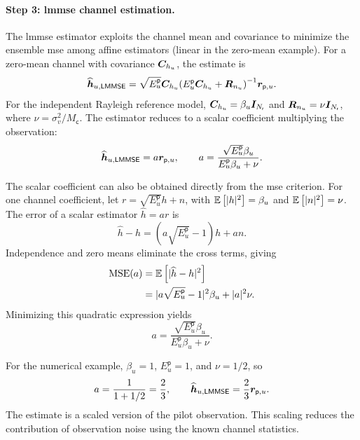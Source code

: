 \paragraph{Step 3: \ac{lmmse} channel estimation.}
The \ac{lmmse} estimator exploits the channel mean and covariance to minimize the ensemble \ac{mse} among affine estimators (linear in the zero-mean example). For a zero-mean channel with covariance $\bm{C}_{h_u}$, the estimate is
\begin{equation}
	\widehat{\bm{h}}_{u,\mathsf{LMMSE}}
	=\sqrt{E_u^{\mathsf p}}\bm{C}_{h_u}
	{(E_u^{\mathsf p}\bm{C}_{h_u}+\bm{R}_{n_u})}^{-1}
	\bm{r}_{\mathsf p,u}.
	\label{eq06:pilot-lmmse}
\end{equation}
For the independent Rayleigh reference model, $\bm{C}_{h_u}=\beta_u\bm{I}_{N_{\mathsf{r}}}$ and $\bm{R}_{n_u}=\nu\bm{I}_{N_{\mathsf{r}}}$, where $\nu=\sigma_v^2/M_{\mathsf c}$. The estimator reduces to a scalar coefficient multiplying the observation:
\begin{equation*}
	\widehat{\bm{h}}_{u,\mathsf{LMMSE}}=a\bm{r}_{\mathsf p,u},
	\qquad
	a=\frac{\sqrt{E_u^{\mathsf p}}\beta_u}
	{E_u^{\mathsf p}\beta_u+\nu}.
\end{equation*}

The scalar coefficient can also be obtained directly from the \ac{mse} criterion. For one channel coefficient, let $r=\sqrt{E_u^{\mathsf p}}h+n$, with $\mathbb{E}\left[|h|^2\right]=\beta_u$ and $\mathbb{E}\left[|n|^2\right]=\nu$. The error of a scalar estimator $\widehat h=ar$ is
\begin{equation*}
	\widehat h-h
	=(a\sqrt{E_u^{\mathsf p}}-1)h+an.
\end{equation*}
Independence and zero means eliminate the cross terms, giving
\begin{equation*}
	\begin{split}
		\mathrm{MSE}(a)
		&=\mathbb{E}\left[|\widehat h-h|^2\right]\\
		&=|a\sqrt{E_u^{\mathsf p}}-1|^2\beta_u
		+|a|^2\nu.
	\end{split}
\end{equation*}
Minimizing this quadratic expression yields
\begin{equation*}
	a=\frac{\sqrt{E_u^{\mathsf p}}\beta_u}
	{E_u^{\mathsf p}\beta_u+\nu}.
\end{equation*}

For the numerical example, $\beta_u=1$, $E_u^{\mathsf p}=1$, and $\nu=1/2$, so
\begin{equation*}
	a=\frac{1}{1+1/2}=\frac23,
	\qquad
	\widehat{\bm{h}}_{u,\mathsf{LMMSE}}=\frac23\bm{r}_{\mathsf p,u}.
\end{equation*}
The estimate is a scaled version of the pilot observation. This scaling reduces the contribution of observation noise using the known channel statistics.

